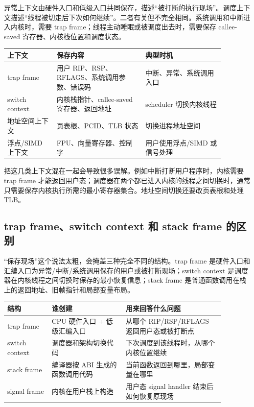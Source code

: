 异常上下文由硬件入口和低级入口共同保存，描述“被打断的执行现场”。调度上下文描述“线程被切走后下次如何继续”。二者有关但不完全相同。系统调用和中断进入内核时，需要 trap frame；线程主动睡眠或被调度出去时，需要保存 callee-saved 寄存器、内核栈位置和调度状态。

\begin{longtable}{p{0.2\linewidth}p{0.36\linewidth}p{0.32\linewidth}}
\toprule
上下文 & 保存内容 & 典型时机 \\
\midrule
trap frame & 用户 RIP、RSP、RFLAGS、系统调用参数、错误码 & 中断、异常、系统调用入口 \\
switch context & 内核栈指针、callee-saved 寄存器、返回地址 & scheduler 切换内核线程 \\
地址空间上下文 & 页表根、PCID、TLB 状态 & 切换进程地址空间 \\
浮点/SIMD 上下文 & FPU、向量寄存器、控制字 & 用户使用浮点/SIMD 或信号处理 \\
\bottomrule
\end{longtable}

把这几类上下文混在一起会导致很多误解。例如中断打断用户程序时，内核需要 trap frame 才能返回用户态；调度器在两个都已进入内核的线程之间切换时，通常只需要保存内核执行所需的最小寄存器集合。地址空间切换还要改页表根和处理 TLB。

\subsection{trap frame、switch context 和 stack frame 的区别}

“保存现场”这个说法太粗，会掩盖三种完全不同的结构。trap frame 是硬件入口和汇编入口为异常/中断/系统调用保存的用户或被打断现场；switch context 是调度器在内核线程之间切换时保存的最小恢复信息；stack frame 是普通函数调用在栈上的返回地址、旧帧指针和局部变量布局。

\begin{longtable}{p{0.18\linewidth}p{0.30\linewidth}p{0.40\linewidth}}
\toprule
结构 & 谁创建 & 用来回答什么问题 \\
\midrule
trap frame & CPU 硬件入口 + 低级汇编入口 & 从哪个 RIP/RSP/RFLAGS 返回用户态或被打断点 \\
switch context & 调度器和架构切换代码 & 下次调度到该线程时，从哪个内核位置继续 \\
stack frame & 编译器按 ABI 生成的函数调用代码 & 当前函数返回到哪里，局部变量在哪里 \\
signal frame & 内核在用户栈上构造 & 用户态 signal handler 结束后如何恢复原现场 \\
\bottomrule
\end{longtable}

